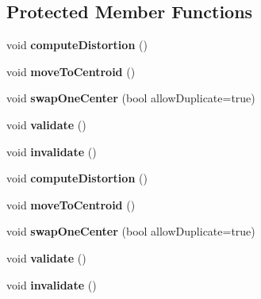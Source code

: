 \subsection*{Protected Member Functions}
\begin{DoxyCompactItemize}
\item 
\hypertarget{class_k_mfilter_centers_aeb46c9b3fee8cf27934f7a2167b3a3bf}{
void {\bfseries computeDistortion} ()}
\label{class_k_mfilter_centers_aeb46c9b3fee8cf27934f7a2167b3a3bf}

\item 
\hypertarget{class_k_mfilter_centers_a63736bb1a24f655919ac4874eabbf4a6}{
void {\bfseries moveToCentroid} ()}
\label{class_k_mfilter_centers_a63736bb1a24f655919ac4874eabbf4a6}

\item 
\hypertarget{class_k_mfilter_centers_a0a11cc33423ff4e4b18fc007173fb75d}{
void {\bfseries swapOneCenter} (bool allowDuplicate=true)}
\label{class_k_mfilter_centers_a0a11cc33423ff4e4b18fc007173fb75d}

\item 
\hypertarget{class_k_mfilter_centers_a0ff60e4d8fbe30c1a1d0bd1701b588ec}{
void {\bfseries validate} ()}
\label{class_k_mfilter_centers_a0ff60e4d8fbe30c1a1d0bd1701b588ec}

\item 
\hypertarget{class_k_mfilter_centers_a4c6631539c6aeb8a85ec0a34eab89788}{
void {\bfseries invalidate} ()}
\label{class_k_mfilter_centers_a4c6631539c6aeb8a85ec0a34eab89788}

\item 
\hypertarget{class_k_mfilter_centers_aeb46c9b3fee8cf27934f7a2167b3a3bf}{
void {\bfseries computeDistortion} ()}
\label{class_k_mfilter_centers_aeb46c9b3fee8cf27934f7a2167b3a3bf}

\item 
\hypertarget{class_k_mfilter_centers_a63736bb1a24f655919ac4874eabbf4a6}{
void {\bfseries moveToCentroid} ()}
\label{class_k_mfilter_centers_a63736bb1a24f655919ac4874eabbf4a6}

\item 
\hypertarget{class_k_mfilter_centers_a0a11cc33423ff4e4b18fc007173fb75d}{
void {\bfseries swapOneCenter} (bool allowDuplicate=true)}
\label{class_k_mfilter_centers_a0a11cc33423ff4e4b18fc007173fb75d}

\item 
\hypertarget{class_k_mfilter_centers_a0ff60e4d8fbe30c1a1d0bd1701b588ec}{
void {\bfseries validate} ()}
\label{class_k_mfilter_centers_a0ff60e4d8fbe30c1a1d0bd1701b588ec}

\item 
\hypertarget{class_k_mfilter_centers_a4c6631539c6aeb8a85ec0a34eab89788}{
void {\bfseries invalidate} ()}
\label{class_k_mfilter_centers_a4c6631539c6aeb8a85ec0a34eab89788}

\end{DoxyCompactItemize}

